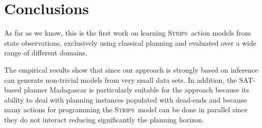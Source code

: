 \documentclass{article}
\newcommand{\strips}{\textsc{Strips}}     %
\begin{document}
\section{Conclusions}
As far as we know, this is the first work on learning \strips\ action models from state observations, exclusively using classical planning and evaluated over a wide range of different domains. %

The empirical results show that since our approach is strongly based on inference can generate non-trivial models from very small data sets. In addition, the SAT-based planner {\sc Madagascar} is particularly suitable for the approach because its ability to deal with planning instances populated with dead-ends and because many actions for programming the \strips\ model can be done in parallel since they do not interact reducing significantly the planning horizon.


\end{document}
